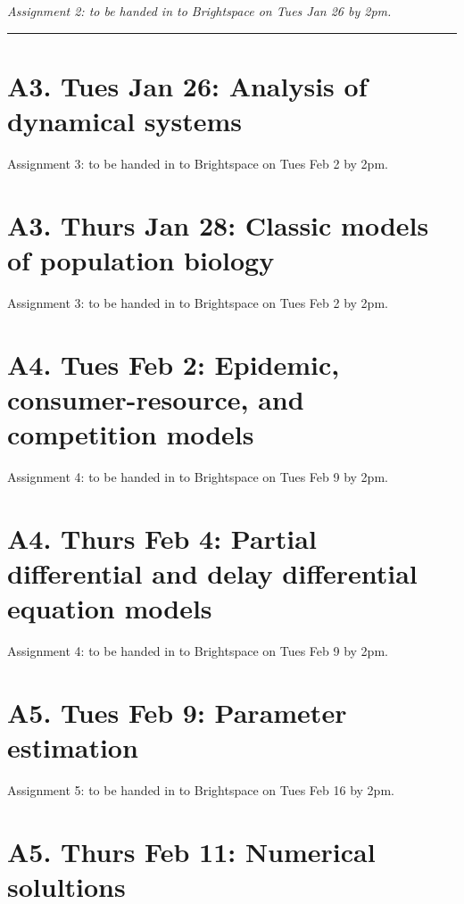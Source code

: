 \documentclass[]{book}
\begin{document}
\emph{Assignment 2: to be handed in to Brightspace on Tues Jan 26 by
2pm.}

\begin{center}\rule{0.5\linewidth}{0.5pt}\end{center}

\chapter{A3. Tues Jan 26: Analysis of dynamical
systems}\label{a3.-tues-jan-26-analysis-of-dynamical-systems}

Assignment 3: to be handed in to Brightspace on Tues Feb 2 by 2pm.

\chapter{A3. Thurs Jan 28: Classic models of population
biology}\label{a3.-thurs-jan-28-classic-models-of-population-biology}

Assignment 3: to be handed in to Brightspace on Tues Feb 2 by 2pm.

\chapter{A4. Tues Feb 2: Epidemic, consumer-resource, and competition
models}\label{a4.-tues-feb-2-epidemic-consumer-resource-and-competition-models}

Assignment 4: to be handed in to Brightspace on Tues Feb 9 by 2pm.

\chapter{A4. Thurs Feb 4: Partial differential and delay differential
equation
models}\label{a4.-thurs-feb-4-partial-differential-and-delay-differential-equation-models}

Assignment 4: to be handed in to Brightspace on Tues Feb 9 by 2pm.

\chapter{A5. Tues Feb 9: Parameter
estimation}\label{a5.-tues-feb-9-parameter-estimation}

Assignment 5: to be handed in to Brightspace on Tues Feb 16 by 2pm.

\chapter{A5. Thurs Feb 11: Numerical
solultions}\label{a5.-thurs-feb-11-numerical-solultions}
\end{document}
